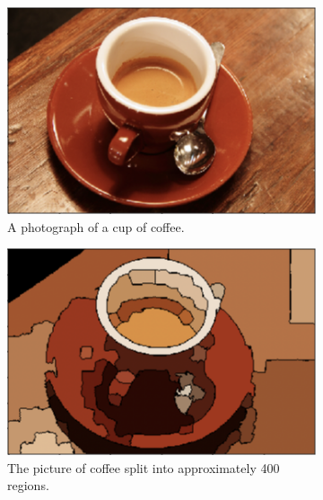 \begin{figure}[htp]
    \centering
    \begin{subfigure}[t]{0.29\textwidth}
        \centering
        \captionsetup{justification=centering}
        \includegraphics[scale=0.34]{figures/adjacencyBefore}
        \caption{A photograph of a cup of coffee.}
    \end{subfigure} \hfill%
    \begin{subfigure}[t]{0.29\textwidth}
        \centering
        \captionsetup{justification=centering}
        \includegraphics[scale=0.34]{figures/adjacencyMiddle}
        \caption{The picture of coffee split into approximately 400 regions.}
    \end{subfigure} \hfill%
    \begin{subfigure}[t]{0.29\textwidth}
        \centering
        \captionsetup{justification=centering}

\end{subfigure}
\end{figure}
